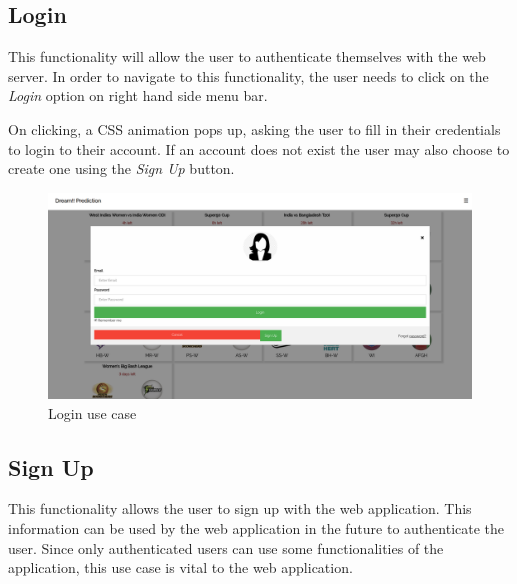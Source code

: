 \documentclass[12pt]{article}
\begin{document}
\subsection{Login}
This functionality will allow the user to authenticate themselves with the web server. In order to navigate to this functionality, the user needs to click on the \textit{Login} option on right hand side menu bar.\par
On clicking, a CSS animation pops up, asking the user to fill in their credentials to login to their account. If an account does not exist the user may also choose to create one using the \textit{Sign Up} button.
\begin{figure}[!h]
\begin{center}
    \includegraphics[scale=0.2]{login.png}
\end{center}
    \caption{Login use case}
\end{figure}


\subsection{Sign Up}
This functionality allows the user to sign up with the web application. This information can be used by the web application in the future to authenticate the user. Since only authenticated users can use some functionalities of the application, this use case is vital to the web application.
\end{document}

